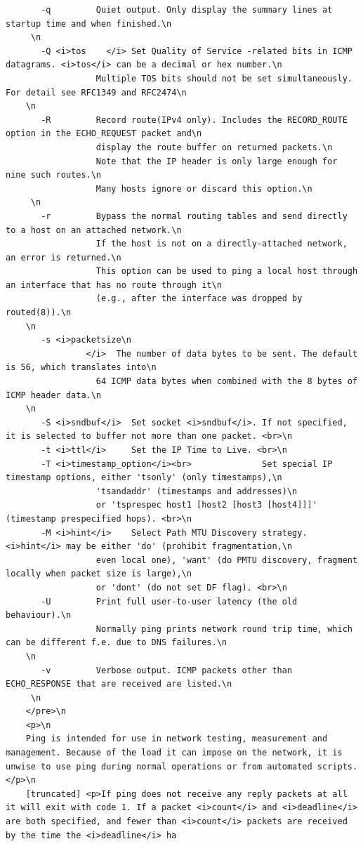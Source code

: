 \documentclass[12pt]{article} %
\begin{document}
\begin{verbatim}
       -q         Quiet output. Only display the summary lines at startup time and when finished.\n
     \n
       -Q <i>tos    </i> Set Quality of Service -related bits in ICMP datagrams. <i>tos</i> can be a decimal or hex number.\n
                  Multiple TOS bits should not be set simultaneously. For detail see RFC1349 and RFC2474\n
    \n
       -R         Record route(IPv4 only). Includes the RECORD_ROUTE option in the ECHO_REQUEST packet and\n
                  display the route buffer on returned packets.\n
                  Note that the IP header is only large enough for nine such routes.\n
                  Many hosts ignore or discard this option.\n
     \n
       -r         Bypass the normal routing tables and send directly to a host on an attached network.\n
                  If the host is not on a directly-attached network, an error is returned.\n
                  This option can be used to ping a local host through an interface that has no route through it\n
                  (e.g., after the interface was dropped by routed(8)).\n
    \n
       -s <i>packetsize\n
                </i>  The number of data bytes to be sent. The default is 56, which translates into\n
                  64 ICMP data bytes when combined with the 8 bytes of ICMP header data.\n
    \n
       -S <i>sndbuf</i>  Set socket <i>sndbuf</i>. If not specified, it is selected to buffer not more than one packet. <br>\n
       -t <i>ttl</i>     Set the IP Time to Live. <br>\n
       -T <i>timestamp_option</i><br>              Set special IP timestamp options, either 'tsonly' (only timestamps),\n
                  'tsandaddr' (timestamps and addresses)\n
                  or 'tsprespec host1 [host2 [host3 [host4]]]' (timestamp prespecified hops). <br>\n
       -M <i>hint</i>    Select Path MTU Discovery strategy. <i>hint</i> may be either 'do' (prohibit fragmentation,\n
                  even local one), 'want' (do PMTU discovery, fragment locally when packet size is large),\n
                  or 'dont' (do not set DF flag). <br>\n
       -U         Print full user-to-user latency (the old behaviour).\n
                  Normally ping prints network round trip time, which can be different f.e. due to DNS failures.\n
    \n
       -v         Verbose output. ICMP packets other than ECHO_RESPONSE that are received are listed.\n
     \n
    </pre>\n
    <p>\n
    Ping is intended for use in network testing, measurement and management. Because of the load it can impose on the network, it is unwise to use ping during normal operations or from automated scripts. </p>\n
    [truncated] <p>If ping does not receive any reply packets at all it will exit with code 1. If a packet <i>count</i> and <i>deadline</i> are both specified, and fewer than <i>count</i> packets are received by the time the <i>deadline</i> ha

\end{verbatim}
\end{document}
